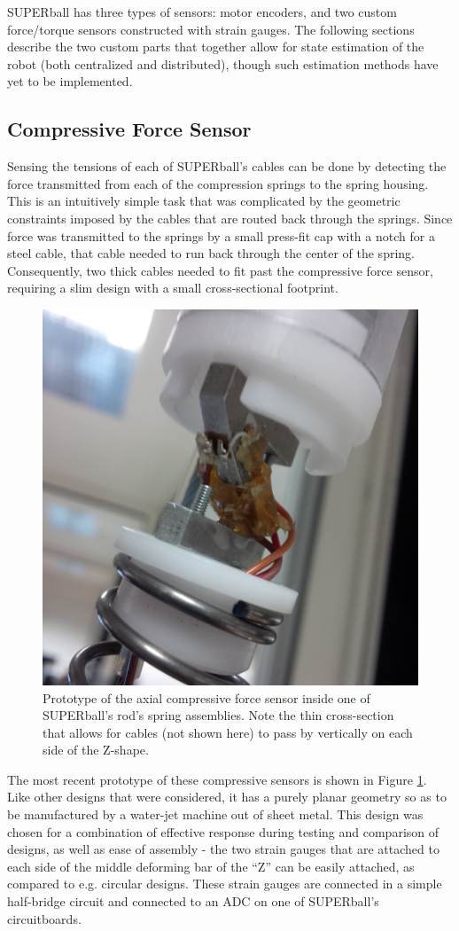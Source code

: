 \documentclass[12pt]{report}
\begin{document}
SUPERball has three types of sensors: motor encoders, and two custom force/torque sensors constructed with strain gauges.
The following sections describe the two custom parts that together allow for state estimation of the robot (both centralized and distributed), though such estimation methods have yet to be implemented.

\subsection{Compressive Force Sensor}

Sensing the tensions of each of SUPERball's cables can be done by detecting the force transmitted from each of the compression springs to the spring housing.
This is an intuitively simple task that was complicated by the geometric constraints imposed by the cables that are routed back through the springs.
Since force was transmitted to the springs by a small press-fit cap with a notch for a steel cable, that cable needed to run back through the center of the spring.
Consequently, two thick cables needed to fit past the compressive force sensor, requiring a slim design with a small cross-sectional footprint.

\begin{figure}[thpb]
      \centering
      \includegraphics[width=.5\columnwidth]{img/SUPERball_compressive_gauge.jpg}
      \caption{Prototype of the axial compressive force sensor inside one of SUPERball's rod's spring assemblies. Note the thin cross-section that allows for cables (not shown here) to pass by vertically on each side of the Z-shape.}
      \label{fig:compressive_strain_gauge}
      \vspace{-0.2cm}
\end{figure}


The most recent prototype of these compressive sensors is shown in Figure \ref{fig:compressive_strain_gauge}.
Like other designs that were considered, it has a purely planar geometry so as to be manufactured by a water-jet machine out of sheet metal.
This design was chosen for a combination of effective response during testing and comparison of designs, as well as ease of assembly - the two strain gauges that are attached to each side of the middle deforming bar of the ``Z'' can be easily attached, as compared to e.g. circular designs.
These strain gauges are connected in a simple half-bridge circuit and connected to an ADC on one of SUPERball's circuitboards.
\end{document}
